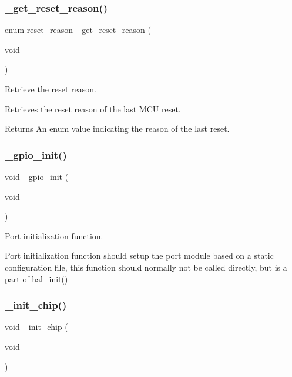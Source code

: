 \subsubsection{\texorpdfstring{\+\_\+get\+\_\+reset\+\_\+reason()}{\_get\_reset\_reason()}}
{\footnotesize\ttfamily enum \hyperlink{group___h_p_l_ga9066b7b3f20c4514ad24dcbff8fa3898}{reset\+\_\+reason} \+\_\+get\+\_\+reset\+\_\+reason (\begin{DoxyParamCaption}\item[{void}]{ }\end{DoxyParamCaption})}



Retrieve the reset reason. 

Retrieves the reset reason of the last M\+CU reset.

\begin{DoxyReturn}{Returns}
An enum value indicating the reason of the last reset. 
\end{DoxyReturn}
\mbox{\label{group___h_p_l_ga6e226919d4a3ee84599b55a32597e284}} 
\subsubsection{\texorpdfstring{\+\_\+gpio\+\_\+init()}{\_gpio\_init()}}
{\footnotesize\ttfamily void \+\_\+gpio\+\_\+init (\begin{DoxyParamCaption}\item[{void}]{ }\end{DoxyParamCaption})}



Port initialization function. 

Port initialization function should setup the port module based on a static configuration file, this function should normally not be called directly, but is a part of hal\+\_\+init() \mbox{\label{group___h_p_l_gac10942d1aec3f0ce14117119db5e9555}} 
\subsubsection{\texorpdfstring{\+\_\+init\+\_\+chip()}{\_init\_chip()}}
{\footnotesize\ttfamily void \+\_\+init\+\_\+chip (\begin{DoxyParamCaption}\item[{void}]{ }\end{DoxyParamCaption})}



